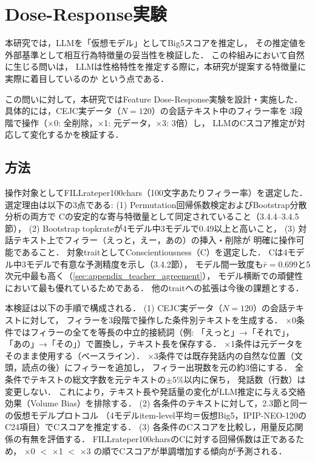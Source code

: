 \documentclass[dvipdfmx,11pt,a4paper]{bxjsarticle}
\renewcommand{\_}{\paperorigunderscore\allowbreak}%
\begin{document}
\section{Dose-Response実験}

本研究では，LLMを「仮想モデル」としてBig5スコアを推定し，
その推定値を外部基準として相互行為特徴量の妥当性を検証した．
この枠組みにおいて自然に生じる問いは，
LLMは性格特性を推定する際に，本研究が提案する特徴量に実際に着目しているのか
という点である．

この問いに対して，本研究ではFeature Dose-Response実験を設計・実施した．
具体的には，CEJC実データ（$N = 120$）の会話テキスト中のフィラー率を
3段階で操作（×0: 全削除，×1: 元データ，×3: 3倍）し，
LLMのCスコア推定が対応して変化するかを検証する．


\subsection{方法}
操作対象としてFILL\_rate\_per\_100chars（100文字あたりフィラー率）を選定した．
選定理由は以下の3点である:
(1) Permutation回帰係数検定およびBootstrap分散分析の両方で
Cの安定的な寄与特徴量として同定されていること（3.4.4--3.4.5節），
(2) Bootstrap topk\_rateが4モデル中3モデルで0.49以上と高いこと，
(3) 対話テキスト上でフィラー（えっと，えー，あの）の挿入・削除が
明確に操作可能であること．
対象traitとしてConscientiousness（C）を選定した．
Cは4モデル中3モデルで有意な予測精度を示し（3.4.2節），
モデル間一致度も$\bar{r} = 0.699$と5次元中最も高く（\ref{sec:appendix_teacher_agreement}），
モデル横断での頑健性において最も優れているためである．
他のtraitへの拡張は今後の課題とする．


本検証は以下の手順で構成される．
(1) CEJC実データ（$N = 120$）の会話テキストに対して，
フィラーを3段階で操作した条件別テキストを生成する．
×0条件ではフィラーの全てを等長の中立的接続詞（例: 「えっと」→「それで」，
「あの」→「その」）で置換し，テキスト長を保存する．
×1条件は元データをそのまま使用する（ベースライン）．
×3条件では既存発話内の自然な位置（文頭，読点の後）にフィラーを追加し，
フィラー出現数を元の約3倍にする．
全条件でテキストの総文字数を元テキストの$\pm 5\%$以内に保ち，
発話数（行数）は変更しない．
これにより，テキスト長や発話量の変化がLLM推定に与える交絡効果（Volume Bias）を排除する．
(2) 各条件のテキストに対して，2.3節と同一の仮想モデルプロトコル
（4モデルitem-level平均＝仮想Big5，IPIP-NEO-120のC24項目）でCスコアを推定する．
(3) 各条件のCスコアを比較し，用量反応関係の有無を評価する．
FILL\_rate\_per\_100charsのCに対する回帰係数は正であるため，
×0 $<$ ×1 $<$ ×3 の順でCスコアが単調増加する傾向が予測される．
\end{document}
